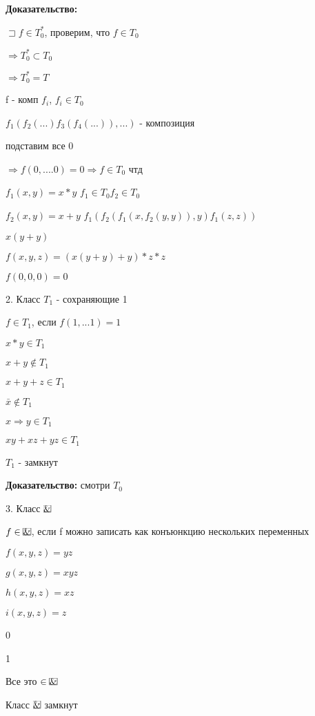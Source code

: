 \documentclass[russian]{lecture-notes}
\begin{document}
	\textbf{Доказательство:}

	$\sqsupset f \in T_{0}^{*}$, проверим, что $f \in T_{0}$

	$\Rightarrow T_{0}^{*} \subset T_{0}$

	$\Rightarrow T_{0}^{*} = T$

	f - комп $f_{i}$, $f_{i} \in T_{0}$

	$f_{1}(f_{2}(...)f_{3}(f_{4}(...)),...)$ - композиция

	подставим все 0

	$\Rightarrow f(0,....0) = 0 \Rightarrow f \in T_{0} $ чтд

	\begin{example}
		$f_{1}(x,y) = x*y$ \qquad $f_{1} \in T_{0} f_{2} \in T_{0}$

		$f_{2}(x,y) = x+y$ \qquad $f_{1}(f_{2}(f_{1}(x,f_{2}(y,y)),y)f_{1}(z,z))$

		$x(y+y)$

		$f(x,y,z) = (x(y+y)+y)*z*z$

		$f(0,0,0) = 0$

		2. Класс $T_{1}$ - сохраняющие 1

		$f \in T_{1}$, если $f(1,...1) = 1$

		$x*y \in T_{1}$

		$x+y \notin T_{1}$

		$x+y+z \in T_{1}$

		$\bar{x} \notin T_{1}$

		$x \Rightarrow y \in T_{1}$

		$xy + xz + yz \in T_{1}$

		\begin{proposition}
			$T_{1}$ - замкнут
			\end {proposition}


		\textbf{Доказательство:} смотри $T_{0}$

		3. Класс $\frame{\&}$

		$f \in \frame{\&}$, если f можно записать как конъюнкцию нескольких переменных

		$f(x,y,z) = yz$

		$g(x,y,z) = xyz$

		$h(x,y,z) = xz$

		$i(x,y,z) = z$

		0

		1

		Все это $\in \frame{\&}$

		\begin{proposition}
			Класс $\frame{\&}$ замкнут
			\end{proposition}


\end{example}
\end{document}

